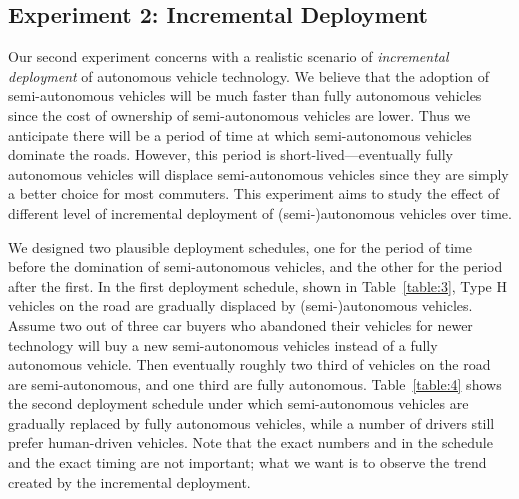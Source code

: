 \subsection{Experiment 2: Incremental Deployment}

Our second experiment concerns with a realistic scenario of
\emph{incremental deployment} of autonomous vehicle technology.  We
believe that the adoption of semi-autonomous vehicles will be much
faster than fully autonomous vehicles since the cost of ownership of
semi-autonomous vehicles are lower.  Thus we anticipate there will be
a period of time at which semi-autonomous vehicles dominate the roads.
However, this period is short-lived---eventually fully autonomous
vehicles will displace semi-autonomous vehicles since they are simply
a better choice for most commuters.  This experiment aims to study the
effect of different level of incremental deployment of
(semi-)autonomous vehicles over time.

We designed two plausible deployment schedules, one for the period of
time before the domination of semi-autonomous vehicles, and the other
for the period after the first.  In the first deployment schedule,
shown in Table~\ref{table:3}, Type H vehicles on the road are
gradually displaced by (semi-)autonomous vehicles.  Assume two out of
three car buyers who abandoned their vehicles for newer technology
will buy a new semi-autonomous vehicles instead of a fully autonomous
vehicle.  Then eventually roughly two third of vehicles on the road
are semi-autonomous, and one third are fully autonomous.
Table~\ref{table:4} shows the second deployment schedule under which
semi-autonomous vehicles are gradually replaced by fully autonomous
vehicles, while a number of drivers still prefer human-driven
vehicles. Note that the exact numbers and in the schedule and the
exact timing are not important; what we want is to observe the trend
created by the incremental deployment.

